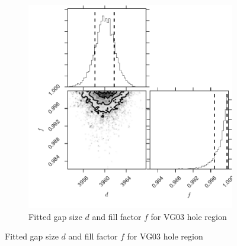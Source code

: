 

\begin{figure}[htbp]
        \centering
        \begin{subfigure}[b]{0.5\textwidth}
              \includegraphics[width=\textwidth]{chSiGaps/figs/VG03_corner.pdf}
              \caption{Fitted gap size $d$ and fill factor $f$ for VG03 hole region}
		\label{figVG03_corner}
        \end{subfigure}


\end{figure}
